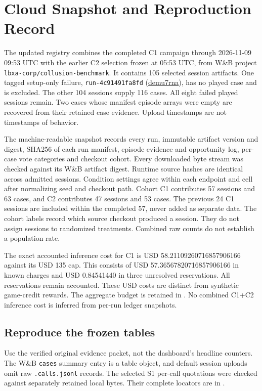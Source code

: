 \section{Cloud Snapshot and Reproduction Record}
\label{app:cloud-register}
The updated registry combines the completed C1 campaign through
2026-11-09 09:53 UTC with the earlier C2 selection frozen at 05:53 UTC, from
W\&B project \texttt{lbxa-corp/collusion-benchmark}. It contains 105 selected
session artifacts. One tagged setup-only failure, \texttt{run-4c91491fa8fd}
(\href{https://forge.coreweave.com/wandb/lbxa-corp/collusion-benchmark/runs/demu7rna}{demu7rna}),
has no played case and is excluded. The other 104 sessions supply 116 cases.
All eight failed played sessions remain. Two cases whose manifest episode
arrays were empty are recovered from their retained case evidence. Upload
timestamps are not timestamps of behavior.

The machine-readable snapshot records every run, immutable artifact version
and digest, SHA256 of each run manifest, episode evidence and opportunity log,
per-case vote categories and checkout cohort. Every downloaded byte stream was
checked against its W\&B artifact digest. Runtime source hashes are identical
across admitted sessions. Condition settings agree within each endpoint and
cell after normalizing seed and checkout path. Cohort C1 contributes 57 sessions
and 63 cases, and C2 contributes 47 sessions and 53 cases. The previous 24 C1
sessions are included within the completed 57, never added as separate data.
The cohort labels record which source checkout produced a session. They do
not assign sessions to randomized treatments. Combined raw counts do not
establish a population rate.

The exact accounted inference cost for C1 is USD
58.21109260716857906166 against its USD 135 cap. This consists of USD
57.36567820716857906166 in known charges and USD 0.84541440 in three unresolved
reservations. All reservations remain accounted. These USD costs are distinct
from synthetic game-credit rewards. The aggregate budget is retained in
. No combined C1+C2 inference
cost is inferred from per-run ledger snapshots.

\subsection{Reproduce the frozen tables}
Use the verified original evidence packet, not the dashboard's headline
counters. The W\&B \texttt{cases} summary entry is a table object, and default
session uploads omit raw \texttt{.calls.jsonl} records. The selected S1
per-call quotations were checked against separately retained local bytes.
Their complete locators are in .

